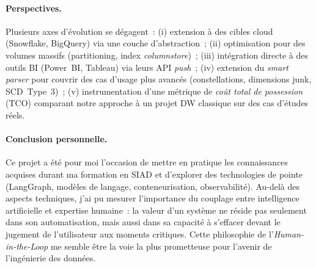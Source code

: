 \documentclass[12pt, a4paper]{report}
\begin{document}
\paragraph{Perspectives.}
Plusieurs axes d'évolution se dégagent~: (i) extension à des cibles
cloud (Snowflake, BigQuery) via une couche d'abstraction~;
(ii) optimisation pour des volumes massifs (partitioning, index
\emph{columnstore})~; (iii) intégration directe à des outils \ac{BI}
(Power~BI, Tableau) via leurs API \emph{push}~; (iv) extension du
\emph{smart parser} pour couvrir des cas d'usage plus avancés
(constellations, dimensions junk, \ac{SCD}~Type~3)~;
(v) instrumentation d'une métrique de \emph{coût total de
possession} (TCO) comparant notre approche à un projet \ac{DW}
classique sur des cas d'études réels.

\paragraph{Conclusion personnelle.}
Ce projet a été pour moi l'occasion de mettre en pratique les
connaissances acquises durant ma formation en \ac{SIAD} et
d'explorer des technologies de pointe (LangGraph, modèles
de langage, conteneurisation, observabilité). Au-delà des aspects
techniques, j'ai pu mesurer l'importance du couplage entre
intelligence artificielle et expertise humaine~: la valeur d'un
système ne réside pas seulement dans son automatisation, mais aussi
dans sa capacité à s'effacer devant le jugement de l'utilisateur
aux moments critiques. Cette philosophie de l'\emph{Human-in-the-Loop}
me semble être la voie la plus prometteuse pour l'avenir de
l'ingénierie des données.

\cleardoublepage
\end{document}
